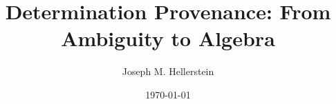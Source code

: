 %
%

\usepackage{microtype}
\raggedbottom
\usepackage{enumitem}
\usepackage{amsthm}
\usepackage{stmaryrd}
\usepackage{caption}
\usepackage{booktabs}
\usepackage{tikz}
\usepackage{xcolor}

\newcommand{\jmh}[1]{\textcolor{red}{\textit{#1 -- JMH}}}

\usepackage{det-notation}
\newcommand{\Hist}{\mathcal{H}}
\newcommand{\drule}{\mathrel{:\!-}}
\newcommand{\snap}{\mathsf{snap}}
\newcommand{\seal}{\mathsf{seal}}
\newcommand{\seq}{\mathbin{\triangleright}}
\newcommand{\Ord}{\OrdO}
\newcommand{\Obs}{\mathsf{Obs}}      %
\newcommand{\Cond}{\operatorname{Cond}}
\newcommand{\Prov}{\operatorname{Prov}}
\newcommand{\tru}{\mathsf{true}}
\newcommand{\fls}{\mathsf{false}}
\newcommand{\truth}[1]{\llbracket #1 \rrbracket}

\newtheorem{definition}{Definition}
\newtheorem{theorem}{Theorem}
\newtheorem{lemma}{Lemma}
\newtheorem{corollary}{Corollary}
\newtheorem{proposition}{Proposition}
\theoremstyle{remark}
\newtheorem{remark}{Remark}
\newtheorem{example}{Example}
\newtheorem{observation}{Observation}
\newtheorem{assumption}{Assumption}


\title{Determination Provenance: From Ambiguity to Algebra}
\author{Joseph M. Hellerstein}
\date{\today}
